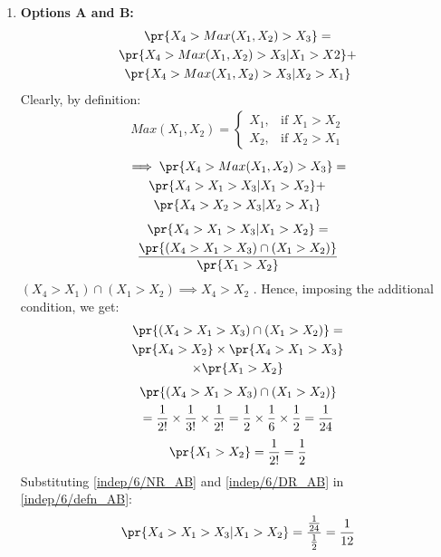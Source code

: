 \begin{enumerate}
    \item \textbf{Options A and B:}
\begin{multline}
    \pr{X_4 > Max(X_1,X_2) > X_3} = \\\pr{X_4 > Max(X_1,X_2) > X_3 | X_1>X2 } + \\ \pr{X_4 > Max(X_1,X_2) > X_3 | X_2>X_1 }
\end{multline}
Clearly, by definition:
\begin{align}
  Max(X_1,X_2) = 
  \begin{cases}
      X_1, & \text{if } X_1>X_2\\
    X_2, & \text{if } X_2>X_1
  \end{cases}
\end{align}
\begin{multline}
    \implies \pr{X_4 > Max(X_1,X_2) > X_3} = \\\pr{X_4 > X_1 > X_3| X_1 > X_2 } + \\ \pr{X_4 > X_2 > X_3| X_2 > X_1}
\end{multline}
\begin{multline}
    \pr{X_4 > X_1 > X_3 | X_1 > X_2 } = \\ \frac{\pr{(X_4 > X_1 > X_3) \cap (X_1 > X_2) }}{\pr{X_1>X_2}} \label{indep/6/defn_AB}
\end{multline}
$(X_4>X_1) \cap (X_1>X_2) \implies X_4>X_2$ . Hence, imposing the additional condition, we get:
\begin{multline}
    \pr{(X_4 > X_1 > X_3) \cap (X_1 > X_2)} = \\\pr{X_4>X_2} \times \pr{X_4 > X_1 > X_3}\\ \times \pr{X_1 > X_2}
\end{multline}
\begin{multline}
 \pr{(X_4 > X_1 > X_3) \cap (X_1 > X_2)}\\
    = \frac{1}{2!}\times \frac{1}{3!}\times \frac{1}{2!}
    = \frac{1}{2}\times \frac{1}{6}\times \frac{1}{2}= \frac{1}{24} \label{indep/6/NR_AB}
\end{multline}
\begin{align}
    \pr{X_1>X_2} = \frac{1}{2!} = \frac{1}{2} \label{indep/6/DR_AB}
\end{align}
Substituting \eqref{indep/6/NR_AB} and \eqref{indep/6/DR_AB} in \eqref{indep/6/defn_AB}:
\begin{align}
    \pr{X_4 > X_1 > X_3 | X_1 > X_2 } = \dfrac{\frac{1}{24}}{\frac{1}{2}} = \frac{1}{12}
\end{align}

\end{enumerate}
